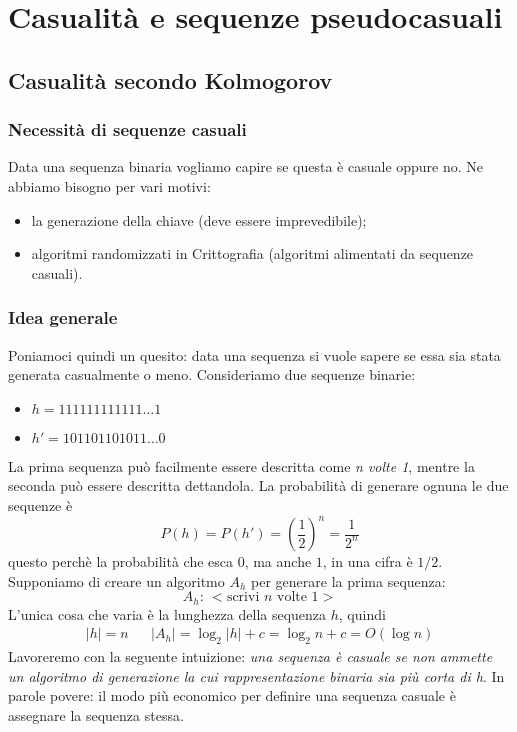 \part{Casualità e sequenze pseudocasuali}
\chapter{Casualità secondo Kolmogorov}
\section{Necessità di sequenze casuali}
Data una sequenza binaria vogliamo capire se questa è casuale oppure no. 
Ne abbiamo bisogno per vari motivi:
\begin{itemize}
	\item la generazione della chiave (deve essere imprevedibile);
	\item algoritmi randomizzati in Crittografia (algoritmi alimentati da sequenze casuali).
\end{itemize}

\section{Idea generale}
Poniamoci quindi un quesito: data una sequenza si vuole sapere se essa sia stata generata casualmente o meno. Consideriamo due sequenze binarie:
\begin{multicols}{2}
\begin{itemize}
    \item $h=111111111111\dots 1$
    \item $h'=101101101011\dots 0$
\end{itemize}
\end{multicols}
\noindent La prima sequenza può facilmente essere descritta come \emph{n volte 1}, mentre la seconda può essere descritta dettandola. La probabilità di generare ognuna le due sequenze è \[P(h)=P(h')=\left(\frac{1}{2}\right)^n=\frac{1}{2^n}\]
questo perchè la probabilità che esca $0$, ma anche $1$, in una cifra è $1/2$. Supponiamo di creare un algoritmo $A_h$ per generare la prima sequenza:
$$ A_h:\,<\text{scrivi $n$ volte $1$}> $$
L'unica cosa che varia è la lunghezza della sequenza $h$, quindi
\begin{align*}|h| = n && |A_h| = \log_2 |h|+c=\log_2n + c=O(\log n) \end{align*}
Lavoreremo con la seguente intuizione: \emph{una sequenza è casuale se non ammette un algoritmo di generazione la cui rappresentazione binaria sia più corta di h}. In parole povere: il modo più economico per definire una sequenza casuale è assegnare la sequenza stessa.

